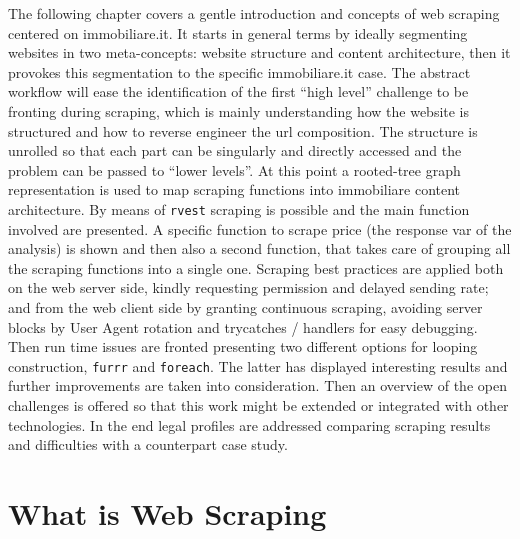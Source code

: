 \documentclass[
  12pt,
  a4paper,
  oneside]{book}
\begin{document}
The following chapter covers a gentle introduction and concepts of web scraping centered on immobiliare.it. It starts in general terms by ideally segmenting websites in two meta-concepts: website structure and content architecture, then it provokes this segmentation to the specific immobiliare.it case. The abstract workflow will ease the identification of the first ``high level'' challenge to be fronting during scraping, which is mainly understanding how the website is structured and how to reverse engineer the url composition. The structure is unrolled so that each part can be singularly and directly accessed and the problem can be passed to ``lower levels''. At this point a rooted-tree graph representation is used to map scraping functions into immobiliare content architecture. By means of \texttt{rvest} scraping is possible and the main function involved are presented. A specific function to scrape price (the response var of the analysis) is shown and then also a second function, that takes care of grouping all the scraping functions into a single one. Scraping best practices are applied both on the web server side, kindly requesting permission and delayed sending rate; and from the web client side by granting continuous scraping, avoiding server blocks by User Agent rotation and trycatches / handlers for easy debugging. Then run time issues are fronted presenting two different options for looping construction, \texttt{furrr} and \texttt{foreach}. The latter has displayed interesting results and further improvements are taken into consideration. Then an overview of the open challenges is offered so that this work might be extended or integrated with other technologies. In the end legal profiles are addressed comparing scraping results and difficulties with a counterpart case study.

\hypertarget{what-is-web-scraping}{%
\section{What is Web Scraping}\label{what-is-web-scraping}}
\end{document}
